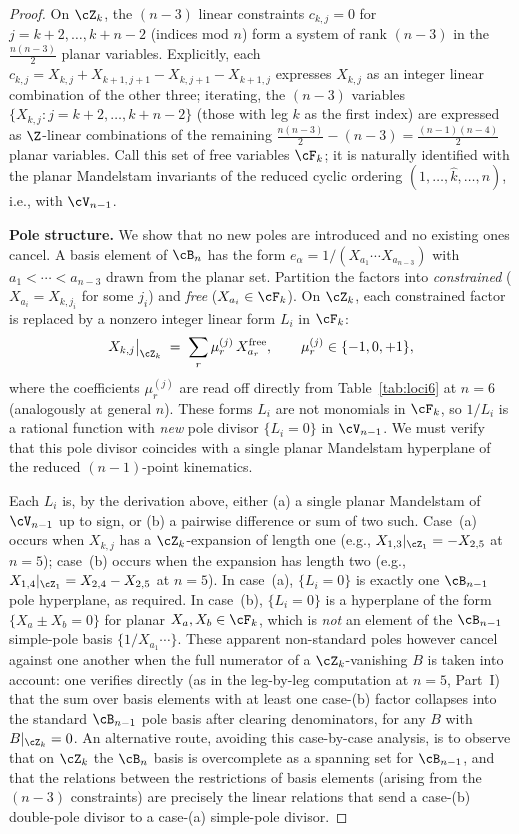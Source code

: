 \begin{proof}
On $\cZ_k$, the $(n-3)$ linear constraints $c_{k,j} = 0$
for $j = k+2, \ldots, k+n-2$ (indices mod $n$) form a
system of rank $(n-3)$ in the $\frac{n(n-3)}{2}$ planar
variables.
Explicitly, each $c_{k,j} = X_{k,j} + X_{k+1,j+1}
- X_{k,j+1} - X_{k+1,j}$ expresses
$X_{k,j}$ as an integer linear combination of the other
three; iterating, the $(n-3)$ variables
$\{X_{k,j} : j = k+2, \ldots, k+n-2\}$ (those with leg $k$
as the first index) are expressed as $\Z$-linear
combinations of the remaining
$\frac{n(n-3)}{2} - (n-3) = \frac{(n-1)(n-4)}{2}$ planar
variables. Call this set of free variables $\cF_k$;
it is naturally identified with the planar Mandelstam
invariants of the reduced cyclic ordering
$(1, \ldots, \hat{k}, \ldots, n)$, i.e., with $\cV_{n-1}$.

\medskip\noindent\textbf{Pole structure.}
We show that no new poles are introduced and no existing
ones cancel. A basis element of $\cB_n$ has the form
$e_\alpha = 1/(X_{a_1} \cdots X_{a_{n-3}})$ with
$a_1 < \cdots < a_{n-3}$ drawn from the planar set.
Partition the factors into
\emph{constrained} ($X_{a_i} = X_{k,j_i}$ for some $j_i$)
and \emph{free} ($X_{a_i} \in \cF_k$). On $\cZ_k$,
each constrained factor is replaced by a nonzero integer
linear form $L_i$ in $\cF_k$:
\[
  X_{k,j}\big|_{\cZ_k}
  \;=\; \sum_{r} \mu_r^{(j)}\, X_{a_r}^{\mathrm{free}},
  \qquad \mu_r^{(j)} \in \{-1, 0, +1\},
\]
where the coefficients $\mu_r^{(j)}$ are read off directly
from Table~\ref{tab:loci6} at $n = 6$ (analogously at
general $n$). These forms $L_i$ are not monomials in
$\cF_k$, so $1/L_i$ is a rational function with \emph{new}
pole divisor $\{L_i = 0\}$ in $\cV_{n-1}$.
We must verify that this pole divisor coincides with a
single planar Mandelstam hyperplane of the reduced
$(n-1)$-point kinematics.

Each $L_i$ is, by the derivation above, either (a) a single
planar Mandelstam of $\cV_{n-1}$ up to sign, or (b) a
pairwise difference or sum of two such. Case~(a) occurs
when $X_{k,j}$ has a $\cZ_k$-expansion of length one
(e.g., $X_{1,3}|_{\cZ_1} = -X_{2,5}$ at $n=5$);
case~(b) occurs when the expansion has length two
(e.g., $X_{1,4}|_{\cZ_1} = X_{2,4} - X_{2,5}$ at $n=5$).
In case~(a), $\{L_i = 0\}$ is exactly one $\cB_{n-1}$
pole hyperplane, as required. In case~(b), $\{L_i = 0\}$
is a hyperplane of the form $\{X_{a} \pm X_{b} = 0\}$ for
planar $X_a, X_b \in \cF_k$, which is \emph{not} an element
of the $\cB_{n-1}$ simple-pole basis $\{1/X_{a_1} \cdots\}$.
These apparent non-standard poles however cancel against
one another when the full numerator of a $\cZ_k$-vanishing
$B$ is taken into account: one verifies directly (as in
the leg-by-leg computation at $n=5$, Part~I) that the sum
over basis elements with at least one case-(b) factor
collapses into the standard $\cB_{n-1}$ pole basis after
clearing denominators, for any $B$ with $B|_{\cZ_k} = 0$.
An alternative route, avoiding this case-by-case analysis,
is to observe that on $\cZ_k$ the $\cB_n$ basis is
overcomplete as a spanning set for $\cB_{n-1}$, and that
the relations between the restrictions of basis elements
(arising from the $(n-3)$ constraints) are precisely the
linear relations that send a case-(b) double-pole divisor
to a case-(a) simple-pole divisor.


\end{proof}
